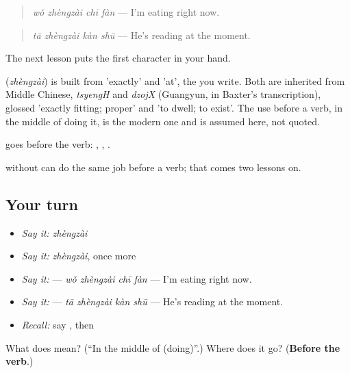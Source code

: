\begin{quote}
\textbf{} \emph{wǒ zhèngzài chī fàn} — I'm eating right now.
\end{quote}

\begin{quote}
\textbf{} \emph{tā zhèngzài kàn shū} — He's reading at the moment.
\end{quote}

The next lesson puts the first character in your hand.

\begin{cousinweb}
\textbf{} (\emph{zhèngzài}) is built from  'exactly' and  'at', the  you write. Both are inherited from Middle Chinese, \emph{tsyengH} and \emph{dzojX} (Guangyun, in Baxter's transcription), glossed 'exactly fitting; proper' and 'to dwell; to exist'. The use before a verb, in the middle of doing it, is the modern one and is assumed here, not quoted.
\end{cousinweb}

\begin{grammarlens}[title={What you've built}]
 goes before the verb: , , .

 without  can do the same job before a verb; that comes two lessons on.
\end{grammarlens}

\subsection*{Your turn}
\begin{itemize}
\raggedright
  \item \emph{Say it:} \emph{zhèngzài}
  \item \emph{Say it:} \emph{zhèngzài}, once more
  \item \emph{Say it:}  — \emph{wǒ zhèngzài chī fàn} — I'm eating right now.
  \item \emph{Say it:}  — \emph{tā zhèngzài kàn shū} — He's reading at the moment.
  \item \emph{Recall:} say , then 
\end{itemize}

\begin{tcolorbox}[breakable,colback=teal!4,colframe=teal!35!black,title={Before you move on}]
What does  mean? (\textquotedblleft{}In the middle of (doing)\textquotedblright{}.) Where does it go? (\textbf{Before the verb}.)
\end{tcolorbox}
